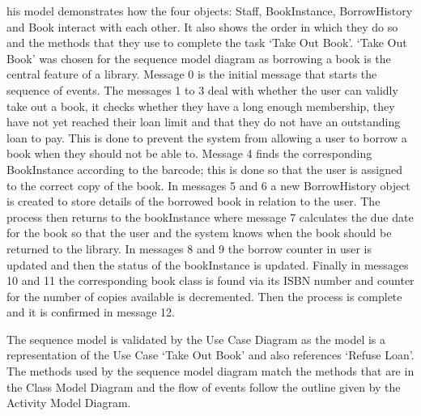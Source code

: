 his model demonstrates how the four objects: Staff, BookInstance, BorrowHistory and Book interact with each other. It also shows the order in which they do so and the methods that they use to complete the task ‘Take Out Book’. ‘Take Out Book’ was chosen for the sequence model diagram as borrowing a book is the central feature of a library. Message 0 is the initial message that starts the sequence of events. The messages 1 to 3 deal with whether the user can validly take out a book, it checks whether they have a long enough membership, they have not yet reached their loan limit and that they do not have an outstanding loan to pay. This is done to prevent the system from allowing a user to borrow a book when they should not be able to. Message 4 finds the corresponding BookInstance according to the barcode; this is done so that the user is assigned to the correct copy of the book. In messages 5 and 6 a new BorrowHistory object is created to store details of the borrowed book in relation to the user. The process then returns to the bookInstance where message 7 calculates the due date for the book so that the user and the system knows when the book should be returned to the library. In messages 8 and 9 the borrow counter in user is updated and then the status of the bookInstance is updated. Finally in messages 10 and 11 the corresponding book class is found via its ISBN number and counter for the number of copies available is decremented. Then the process is complete and it is confirmed in message 12.

The sequence model is validated by the Use Case Diagram as the model is a representation of the Use Case ‘Take Out Book’ and also references ‘Refuse Loan’. The methods used by the sequence model diagram match the methods that are in the Class Model Diagram and the flow of events follow the outline given by the Activity Model Diagram.
